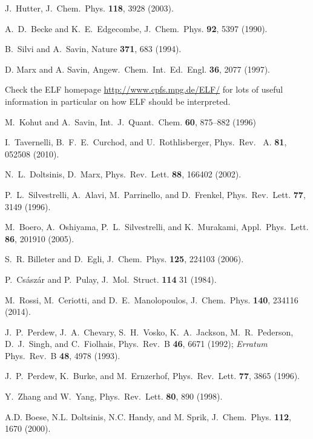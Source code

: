 \documentclass[twoside,10pt,titlepage,a4paper]{article}
\newcommand{\htref}[2]{\href{#1}{#2}}
\newcommand{\htref}[2]{\htmladdnormallink{#2}{#1}}
\begin{document}
\begin{thebibliography}{999}
 J.~Hutter,
    J.~Chem.~Phys. {\bf 118}, 3928 (2003).

    A.~D.~Becke and K.~E.~Edgecombe,
    J.~Chem.~Phys. {\bf 92}, 5397 (1990).

    B.~Silvi and A.~Savin,
    Nature {\bf 371}, 683 (1994).

    D. Marx and A. Savin,
    Angew.~Chem.~Int.~Ed.~Engl. {\bf 36}, 2077 (1997).

    Check the ELF homepage
    \htref{http://www.cpfs.mpg.de/ELF/}%
    {http://www.cpfs.mpg.de/ELF/}
    for lots of useful information in particular on how ELF
    should be interpreted.

    M.~Kohut and A.~Savin,
    Int.~J.~Quant.~Chem. {\bf 60}, 875--882 (1996)

    I.~Tavernelli, B.~F.~E.~Curchod, and U.~Rothlisberger,
    Phys.~Rev.~ A. {\bf 81}, 052508 (2010).

 N.~L.~Doltsinis, D.~Marx,
    Phys.~Rev.~Lett. {\bf 88}, 166402 (2002).

    P.~L.~Silvestrelli, A.~Alavi, M.~Parrinello, and D.~Frenkel,
    Phys.~Rev.~Lett. {\bf 77}, 3149 (1996).

    M.~Boero, A.~Oshiyama, P.~L.~Silvestrelli, and K.~Murakami,
    Appl.~Phys.~Lett. {\bf 86}, 201910 (2005).

    S.~R. Billeter and D.~Egli,
    J.~Chem.~Phys. {\bf 125}, 224103 (2006).

    P.~Cs\'asz\'ar and P.~Pulay,
    J.~Mol.~Struct. {\bf 114} 31 (1984).

    M.~Rossi, M.~Ceriotti, and D.~E.~Manolopoulos, 
    J.~Chem.~Phys. {\bf 140}, 234116 (2014).

    J.~P.~Perdew, J.~A.~Chevary, S.~H.~Vosko, K.~A.~Jackson,
    M.~R.~Pederson, D.~J.~Singh, and C.~Fiolhais, 
    Phys.~Rev.~B {\bf 46}, 6671 (1992);
    {\it Erratum} Phys.~Rev.~B {\bf 48}, 4978 (1993).

    J.~P.~Perdew, K.~Burke, and M.~Ernzerhof,  
    Phys.~Rev.~Lett. {\bf 77}, 3865 (1996).

    Y.~Zhang and W.~Yang, Phys.~Rev.~Lett. {\bf 80}, 890 (1998).

    A.D. Boese, N.L. Doltsinis, N.C. Handy, and M. Sprik,
    J.~Chem.~Phys. {\bf 112}, 1670 (2000).


\end{thebibliography}
\end{document}
